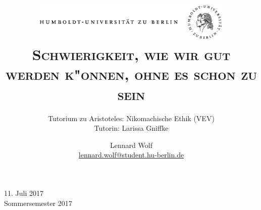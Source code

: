 \documentclass[a4paper, emulatestandardclasses, 12pt]{scrartcl}
\date{\vspace{-3ex}}
\begin{document}
\title{\vspace{5ex}
	\includegraphics*[width=0.72\textwidth]{ErstesSem/images/hu_logo.png}\\
	\vspace{30pt}
	\scshape\LARGE{Schwierigkeit, wie wir gut werden k"onnen, ohne es schon zu sein}}
	
	\subtitle{\vspace{20pt}Tutorium zu Aristoteles: Nikomachische Ethik (VEV)\\
	\vspace{6pt}
          Tutorin: Larissa Gniffke}


\author{\vspace{-4pt}Lennard Wolf\\
        \small{\href{mailto:lennard.wolf@student.hu-berlin.de}{lennard.wolf@student.hu-berlin.de}}}      

\maketitle

\vspace{\fill}

\begin{minipage}[b]{\textwidth}
    \centering
    \onehalfspacing
    \large   
    11. Juli 2017\\
    Sommersemester 2017

    \vspace{-20mm} 
\end{minipage}%
\thispagestyle{empty}
\newpage
\setcounter{page}{1}
\end{document}
